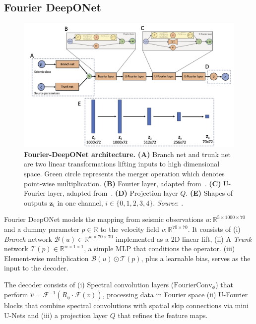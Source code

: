 \documentclass{article}
\begin{document}
\subsection{Fourier DeepONet}

\begin{figure}
    \centering
    \includegraphics[width=0.8\linewidth]{figures/FDONet.png}
    \caption{\textbf{Fourier-DeepONet architecture.} 
    \textbf{(A)} Branch net and trunk net are two linear transformations lifting inputs to high dimensional space. Green circle represents the merger operation which denotes point-wise multiplication. 
    \textbf{(B)} Fourier layer, adapted from~\cite{li2020fourier}. 
    \textbf{(C)} U-Fourier layer, adapted from~\cite{wen2022u}. 
    \textbf{(D)} Projection layer $Q$. 
    \textbf{(E)} Shapes of outputs $\mathbf{z}_i$ in one channel, $i \in \{0,1,2,3,4\}$.
    \emph{Source}: \cite{fdonet}.}
    \label{fig:fdonet}
\end{figure}

Fourier DeepONet models the mapping from seismic observations \(u: \mathbb{R}^{5 \times 1000 \times 70}\) and a dummy parameter \(p\in\mathbb{R}\) to the velocity field \(v:\mathbb{R}^{70\times70}\). It consists of (i) \emph{Branch} network \(\mathcal{B}(u)\in \mathbb{R}^{w\times70\times70}\) implemented as a 2D linear lift, (ii) A \emph{Trunk} network \(\mathcal{T}(p)\in \mathbb{R}^{w\times1\times1}\), a simple MLP that conditions the operator. (iii) Element-wise multiplication \(\mathcal{B}(u)\odot\mathcal{T}(p)\), plus a learnable bias, serves as the input to the decoder.

The decoder consists of (i) Spectral convolution layers (\(\text{FourierConv}_\phi\)) that perform \(\hat v = \mathcal{F}^{-1}(R_\phi \cdot \mathcal{F}(v))\), processing data in Fourier space (ii) U-Fourier blocks that combine spectral convolutions with spatial skip connections via mini U-Nets and (iii) a projection layer \(Q\) that refines the feature maps.
\end{document}
